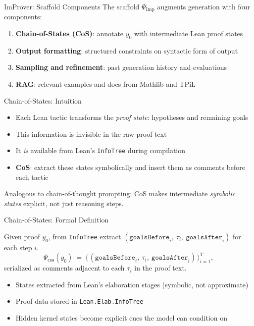 \documentclass{beamer}
\newcommand{\highlight}[1]{\textcolor{improverOrange}{\textbf{#1}}}
\begin{document}
\begin{frame}{ImProver: Scaffold Components}
\vspace{0.4em}
The scaffold $\Psi_{\mathrm{Imp}}$ augments generation with four components:
\vspace{0.3em}
\begin{enumerate}\setlength{\itemsep}{10pt}
  \item \highlight{Chain-of-States (CoS)}: annotate $y_0$ with intermediate Lean proof states
  \item \highlight{Output formatting}: structured constraints on syntactic form of output
  \item \highlight{Sampling and refinement}: past generation history and evaluations
  \item \highlight{RAG}: relevant examples and docs from Mathlib and TPiL
\end{enumerate}
\end{frame}

\begin{frame}{Chain-of-States: Intuition}
\vspace{0.8em}
\begin{itemize}\setlength{\itemsep}{10pt}
  \item Each Lean tactic transforms the \emph{proof state}: hypotheses and remaining goals
  \item This information is invisible in the raw proof text
  \item It \emph{is} available from Lean's \texttt{InfoTree} during compilation
  \item \textbf{CoS}: extract these states symbolically and insert them as comments before each tactic
\end{itemize}
\vspace{0.8em}
\begin{exampleblock}{}
  Analogous to chain-of-thought prompting: CoS makes intermediate \emph{symbolic states} explicit, not just reasoning steps.
\end{exampleblock}
\end{frame}

\begin{frame}{Chain-of-States: Formal Definition}
\vspace{0.2em}
\begin{definition}
Given proof $y_0$, from \texttt{InfoTree} extract $(\texttt{goalsBefore}_i,\ \tau_i,\ \texttt{goalsAfter}_i)$ for each step $i$.
\[
  \Psi_{\text{cos}}(y_0)\ =\ \bigl\langle\,(\texttt{goalsBefore}_i,\ \tau_i,\ \texttt{goalsAfter}_i)\,\bigr\rangle_{i=1}^T,
\]
serialized as comments adjacent to each $\tau_i$ in the proof text.
\end{definition}
\vspace{0.3em}
\begin{itemize}\setlength{\itemsep}{4pt}
  \item States extracted from Lean's elaboration stages (symbolic, not approximate)
  \item Proof data stored in \texttt{Lean.Elab.InfoTree}
  \item Hidden kernel states become explicit cues the model can condition on
\end{itemize}
\end{frame}
\end{document}
